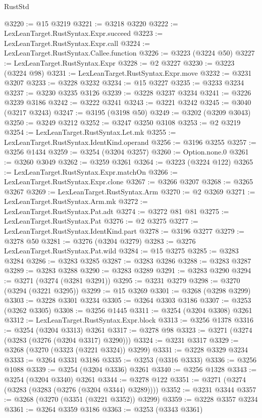 \begin{lexlean}{RustStd}
\begin{coremodule}
@3220 := @15 @3219
@3221 := @3218 @3220
@3222 := LexLeanTarget.RustSyntax.Expr.succeed
@3223 := LexLeanTarget.RustSyntax.Expr.call
@3224 := LexLeanTarget.RustSyntax.Callee.function
@3226 := @3223 (@3224 @50)
@3227 := LexLeanTarget.RustSyntax.Expr
@3228 := @2 @3227
@3230 := @3223 (@3224 @98)
@3231 := LexLeanTarget.RustSyntax.Expr.move
@3232 := @3231 @3207
@3233 := @3228 @3232
@3234 := @15 @3227
@3235 := @3233 @3234
@3237 := @3230 @3235 @3126
@3239 := @3228 @3237 @3234
@3241 := @3226 @3239 @3186
@3242 := @3222 @3241
@3243 := @3221 @3242
@3245 := @3040 (@3217 @3243)
@3247 := @3195 (@3198 @50)
@3249 := @3202 (@3209 @3043)
@3250 := @3249 @3212
@3252 := @3247 @3250 @3108
@3253 := @2 @3219
@3254 := LexLeanTarget.RustSyntax.Let.mk
@3255 := LexLeanTarget.RustSyntax.IdentKind.operand
@3256 := @3196 @3255
@3257 := @3256 @1434
@3259 := @3254 (@3204 @3257)
@3260 := Option.none.{0}
@3261 := @3260 @3049
@3262 := @3259 @3261
@3264 := @3223 (@3224 @122)
@3265 := LexLeanTarget.RustSyntax.Expr.matchOn
@3266 := LexLeanTarget.RustSyntax.Expr.clone
@3267 := @3266 @3207
@3268 := @3265 @3267
@3269 := LexLeanTarget.RustSyntax.Arm
@3270 := @2 @3269
@3271 := LexLeanTarget.RustSyntax.Arm.mk
@3272 := LexLeanTarget.RustSyntax.Pat.adt
@3274 := @3272 @81 @81
@3275 := LexLeanTarget.RustSyntax.Pat
@3276 := @2 @3275
@3277 := LexLeanTarget.RustSyntax.IdentKind.part
@3278 := @3196 @3277
@3279 := @3278 @50
@3281 := @3276 (@3204 @3279)
@3283 := @3276 LexLeanTarget.RustSyntax.Pat.wild
@3284 := @15 @3275
@3285 := @3283 @3284
@3286 := @3283 @3285
@3287 := @3283 @3286
@3288 := @3283 @3287
@3289 := @3283 @3288
@3290 := @3283 @3289
@3291 := @3283 @3290
@3294 := @3271 (@3274 (@3281 @3291))
@3295 := @3231 @3279
@3298 := @3270 (@3294 (@3221 @3295))
@3299 := @15 @3269
@3301 := @3268 (@3298 @3299)
@3303 := @3228 @3301 @3234
@3305 := @3264 @3303 @3186
@3307 := @3253 (@3262 @3305)
@3308 := @3256 @1445
@3311 := @3254 (@3204 @3308) @3261
@3312 := LexLeanTarget.RustSyntax.Expr.block
@3313 := @3256 @1378
@3316 := @3254 (@3204 @3313) @3261
@3317 := @3278 @98
@3323 := @3271 (@3274 (@3283 (@3276 (@3204 @3317) @3290)))
@3324 := @3231 @3317
@3329 := @3268 (@3270 (@3323 (@3221 @3324)) @3299)
@3331 := @3228 @3329 @3234
@3333 := @3264 @3331 @3186
@3335 := @3253 (@3316 @3333)
@3336 := @3256 @1088
@3339 := @3254 (@3204 @3336) @3261
@3340 := @3256 @1328
@3343 := @3254 (@3204 @3340) @3261
@3344 := @3278 @122
@3351 := @3271 (@3274 (@3283 (@3283 (@3276 (@3204 @3344) @3289))))
@3352 := @3231 @3344
@3357 := @3268 (@3270 (@3351 (@3221 @3352)) @3299)
@3359 := @3228 @3357 @3234
@3361 := @3264 @3359 @3186
@3363 := @3253 (@3343 @3361)

\end{coremodule}
\end{lexlean}
